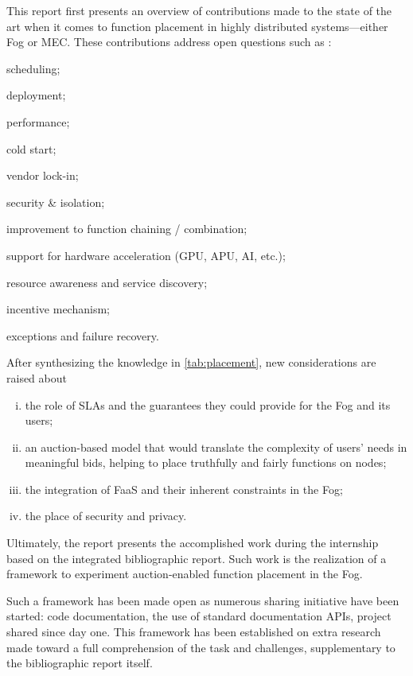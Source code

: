 This report first presents an overview of contributions made to the state of the art when it comes to function placement in highly distributed systems—either Fog or \gls{MEC}. These contributions address open questions such as \cite{kjorveziroski_iot_2021,xie_when_2021}:
\begin{enumerate*}[(a)]
	\item scheduling;
	\item deployment;
	\item performance;
	\item cold start;
	\item vendor lock-in;
	\item security \& isolation;
	\item improvement to function chaining / combination;
	\item support for hardware acceleration (\gls{GPU}, \gls{APU}, \gls{AI}, etc.);
	\item resource awareness and service discovery;
	\item incentive mechanism;
	\item exceptions and failure recovery.
\end{enumerate*}
After synthesizing the knowledge in \cref{tab:placement}, new considerations are raised about
\begin{enumerate}[(i)]
	\item the role of \glspl{SLA} and the guarantees they could provide for the Fog and its users;
	\item an auction-based model that would translate the complexity of users' needs in meaningful bids, helping to place truthfully and fairly functions on nodes;
	\item the integration of \gls{FaaS} and their inherent constraints in the Fog;
	\item the place of security and privacy.
\end{enumerate}

Ultimately, the report presents the accomplished work during the internship based on the integrated bibliographic report. Such work is the realization of a framework to experiment auction-enabled function placement in the Fog.

Such a framework has been made open as numerous sharing initiative have been started: code documentation, the use of standard documentation \glspl{API}, project shared since day one. This framework has been established on extra research made toward a full comprehension of the task and challenges, supplementary to the bibliographic report itself.


